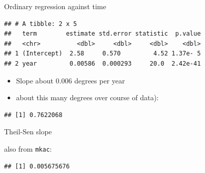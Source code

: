 \documentclass[ignorenonframetext,]{beamer}
\newenvironment{Shaded}{\begin{snugshade}}{\end{snugshade}}
\newcommand{\DataTypeTok}[1]{\textcolor[rgb]{0.13,0.29,0.53}{#1}}
\newcommand{\DecValTok}[1]{\textcolor[rgb]{0.00,0.00,0.81}{#1}}
\newcommand{\KeywordTok}[1]{\textcolor[rgb]{0.13,0.29,0.53}{\textbf{#1}}}
\newcommand{\NormalTok}[1]{#1}
\newcommand{\OperatorTok}[1]{\textcolor[rgb]{0.81,0.36,0.00}{\textbf{#1}}}
\newcommand{\StringTok}[1]{\textcolor[rgb]{0.31,0.60,0.02}{#1}}
\providecommand{\tightlist}{%
  \setlength{\itemsep}{0pt}\setlength{\parskip}{0pt}}
\begin{document}
\begin{frame}[fragile]{Ordinary regression against time}
\protect\hypertarget{ordinary-regression-against-time}{}

\begin{Shaded}
\end{Shaded}

\begin{verbatim}
## # A tibble: 2 x 5
##   term        estimate std.error statistic  p.value
##   <chr>          <dbl>     <dbl>     <dbl>    <dbl>
## 1 (Intercept)  2.58     0.570         4.52 1.37e- 5
## 2 year         0.00586  0.000293     20.0  2.42e-41
\end{verbatim}

\begin{itemize}
\tightlist
\item
  Slope about 0.006 degrees per year
\item
  about this many degrees over course of data):
\end{itemize}

\begin{Shaded}
\end{Shaded}

\begin{verbatim}
## [1] 0.7622068
\end{verbatim}

\end{frame}

\begin{frame}[fragile]{Theil-Sen slope}
\protect\hypertarget{theil-sen-slope}{}

also from \texttt{mkac}:

\begin{Shaded}
\end{Shaded}

\begin{verbatim}
## [1] 0.005675676
\end{verbatim}

\end{frame}
\end{document}
